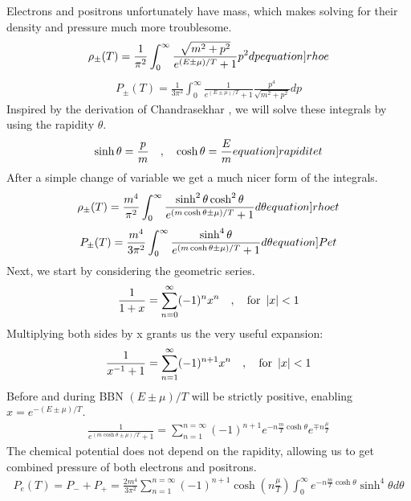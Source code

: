 Electrons and positrons unfortunately have mass, which makes solving for their density and pressure much more troublesome.
\begin{align}
    \rho_\pm(T)=\frac{1}{\pi^2}\int_{0}^{\infty}\frac{\sqrt{m^2+p^2}}{e^{(E\pm\mu)/T}+1}p^2 dp
    \label[equation]{rhoe}
\end{align}
\begin{align}
    P_\pm(T)=\frac{1}{3\pi^2}\int_{0}^{\infty}\frac{1}{e^{(E\pm\mu)/T}+1}\frac{p^4}{\sqrt{m^2+p^2}} dp
\end{align}
Inspired by the derivation of Chandrasekhar \cite{Chandrasekhar}, we will solve these integrals by using the rapidity $\theta$.
\begin{align}
    \sinh \theta = \frac{p}{m}\eqsep \cosh \theta = \frac{E}{m}
    \label[equation]{rapiditet}
\end{align}
After a simple change of variable we get a much nicer form of the integrals.
\begin{align}
    \rho_\pm(T)=\frac{m^4}{\pi^2}\int_{0}^{\infty}\frac{\sinh^2 \theta \cosh^2\theta}{e^{(m \cosh\theta\pm\mu)/T}+1} d\theta
    \label[equation]{rhoet}
\end{align}
\begin{align}
    P_\pm(T)=\frac{m^4}{3\pi^2}\int_{0}^{\infty}\frac{\sinh^4 \theta}{e^{(m \cosh\theta\pm\mu)/T}+1} d\theta
    \label[equation]{Pet}
\end{align}
Next, we start by considering the geometric series.
\begin{align}
    \frac{1}{1+x}=\sum_{n=0}^{\infty}(-1)^n x^n \quad , \quad \text{for  }  \left|x\right|<1
\end{align}
Multiplying both sides by x grants us the very useful expansion:
\begin{align}
    \frac{1}{x^{-1}+1}=\sum_{n=1}^{\infty}(-1)^{n+1} x^n \quad , \quad \text{for  }  \left|x\right|<1
\end{align}
Before and during BBN $(E\pm\mu)/T $ will be strictly positive, enabling $x=e^{-(E\pm\mu)/T}$.
\begin{align}
    \frac{1}{e^{(m \cosh\theta\pm\mu)/T}+1}=\sum_{n=1}^{n=\infty} (-1)^{n+1} e^{-n\frac{m }{T}\cosh\theta}e^{\mp n\frac{\mu}{T}}
    \label{eq:electronseries}
\end{align}
The chemical potential does not depend on the rapidity, allowing us to get combined pressure of both electrons and positrons.
\begin{align}
    P_e(T)=P_-+P_+=\frac{2m^4}{3\pi^2}\sum_{n=1}^{n=\infty} (-1)^{n+1} \cosh{\left(n\frac{\mu}{T}\right)}  \int_{0}^{\infty}e^{-n\frac{m }{T}\cosh\theta}\sinh^4 \theta d\theta
\end{align}

